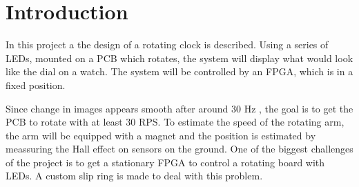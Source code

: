 \section{Introduction}
In this project a the design of a rotating clock is described.
Using a series of LEDs, mounted on a PCB which rotates, the system will display what would look like the dial on a watch.
The system will be controlled by an FPGA, which is in a fixed position.

Since change in images appears smooth after around 30 Hz \cite{article:rpm}, the goal is to get the PCB to rotate with at least 30 RPS.
To estimate the speed of the rotating arm, the arm will be equipped with a magnet and the position is estimated by meassuring the Hall effect on sensors on the ground.
One of the biggest challenges of the project is to get a stationary FPGA to control a rotating board with LEDs.
A custom slip ring is made to deal with this problem.

